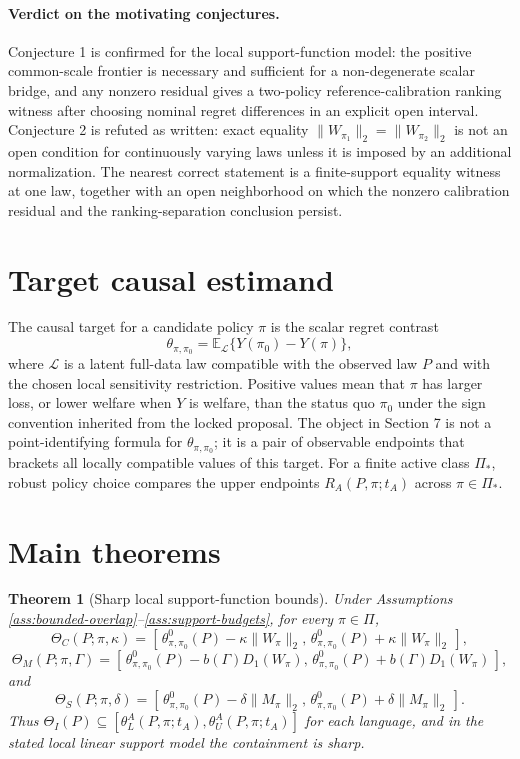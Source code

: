 \documentclass[11pt]{article}
\newcommand{\E}{\mathbb{E}}
\theoremstyle{definition}
\theoremstyle{plain}
\newtheorem{theorem}{Theorem}
\theoremstyle{remark}
\begin{document}
\paragraph{Verdict on the motivating conjectures.}
Conjecture 1 is confirmed for the local support-function model: the positive
common-scale frontier is necessary and sufficient for a non-degenerate scalar bridge,
and any nonzero residual gives a two-policy reference-calibration ranking witness after
choosing nominal regret differences in an explicit open interval.  Conjecture 2 is
refuted as written: exact equality $\|W_{\pi_1}\|_2=\|W_{\pi_2}\|_2$ is not an open
condition for continuously varying laws unless it is imposed by an additional
normalization.  The nearest correct statement is a finite-support equality witness at
one law, together with an open neighborhood on which the nonzero calibration residual
and the ranking-separation conclusion persist.

\section{Target causal estimand}
The causal target for a candidate policy $\pi$ is the scalar regret contrast
\[
  \theta_{\pi,\pi_0}=\E_{\mathcal L}\{Y(\pi_0)-Y(\pi)\},
\]
where $\mathcal L$ is a latent full-data law compatible with the observed law $P$ and
with the chosen local sensitivity restriction.  Positive values mean that $\pi$ has
larger loss, or lower welfare when $Y$ is welfare, than the status quo $\pi_0$ under
the sign convention inherited from the locked proposal.  The object in Section 7 is
not a point-identifying formula for $\theta_{\pi,\pi_0}$; it is a pair of observable
endpoints that brackets all locally compatible values of this target.  For a finite
active class $\Pi_\ast$, robust policy choice compares the upper endpoints
$R_A(P,\pi;t_A)$ across $\pi\in\Pi_\ast$.

\section{Main theorems}
\begin{theorem}[Sharp local support-function bounds]\label{thm:support-bounds}
Under Assumptions \ref{ass:bounded-overlap}--\ref{ass:support-budgets}, for every
$\pi\in\Pi$,
\[
  \Theta_C(P;\pi,\kappa)
  =
  [\,\theta^0_{\pi,\pi_0}(P)-\kappa\|W_\pi\|_2,\,
     \theta^0_{\pi,\pi_0}(P)+\kappa\|W_\pi\|_2\,],
\]
\[
  \Theta_M(P;\pi,\Gamma)
  =
  [\,\theta^0_{\pi,\pi_0}(P)-b(\Gamma)D_1(W_\pi),\,
     \theta^0_{\pi,\pi_0}(P)+b(\Gamma)D_1(W_\pi)\,],
\]
and
\[
  \Theta_S(P;\pi,\delta)
  =
  [\,\theta^0_{\pi,\pi_0}(P)-\delta\|M_\pi\|_2,\,
     \theta^0_{\pi,\pi_0}(P)+\delta\|M_\pi\|_2\,].
\]
Thus $\Theta_I(P)\subseteq[\theta^A_L(P,\pi;t_A),\theta^A_U(P,\pi;t_A)]$ for
each language, and in the stated local linear support model the containment is sharp.
\end{theorem}
\end{document}
